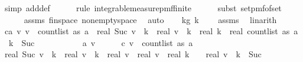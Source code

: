 \begin{isabellebody}
\ {\isacharparenleft}{\kern0pt}simp\ add{\isacharcolon}{\kern0pt}{\isasymOmega}{\isacharunderscore}{\kern0pt}def{\isacharparenright}{\kern0pt}\isanewline
\ \ \ \ \isamarkupfalse%
\ {\isacharparenleft}{\kern0pt}rule\ integrable{\isacharunderscore}{\kern0pt}measure{\isacharunderscore}{\kern0pt}pmf{\isacharunderscore}{\kern0pt}finite{\isacharparenright}{\kern0pt}\isanewline
\ \ \ \ \isamarkupfalse%
\ {\isacharparenleft}{\kern0pt}subst\ set{\isacharunderscore}{\kern0pt}pmf{\isacharunderscore}{\kern0pt}of{\isacharunderscore}{\kern0pt}set{\isacharparenright}{\kern0pt}\isanewline
\ \ \ \ \isamarkupfalse%
\ assms{\isacharparenleft}{\kern0pt}{}{\isacharparenright}{\kern0pt}\ fin{\isacharunderscore}{\kern0pt}space\ non{\isacharunderscore}{\kern0pt}empty{\isacharunderscore}{\kern0pt}space\ \isamarkupfalse%
\ auto\isanewline
\isanewline
\ \ \isamarkupfalse%
\ k{\isacharunderscore}{\kern0pt}g{\isacharunderscore}{\kern0pt}{}{\isacharcolon}{\kern0pt}\ {\isachardoublequoteopen}k\ {\isachargreater}{\kern0pt}\ {}{\isachardoublequoteclose}\ \isamarkupfalse%
\ assms\ \isamarkupfalse%
\ linarith\isanewline
\isanewline
\ \ \isamarkupfalse%
\ c{\isacharcolon}{\kern0pt}{\isachardoublequoteopen}{\isasymAnd}a\ v{\isachardot}{\kern0pt}\ v\ {\isacharless}{\kern0pt}\ count{\isacharunderscore}{\kern0pt}list\ as\ a\ {\isasymLongrightarrow}\ real\ {\isacharparenleft}{\kern0pt}Suc\ v\ {\isacharcircum}{\kern0pt}\ k{\isacharparenright}{\kern0pt}\ {\isacharminus}{\kern0pt}\ real\ {\isacharparenleft}{\kern0pt}v\ {\isacharcircum}{\kern0pt}\ k{\isacharparenright}{\kern0pt}\ {\isasymle}\ real\ k\ {\isacharasterisk}{\kern0pt}\ real\ {\isacharparenleft}{\kern0pt}count{\isacharunderscore}{\kern0pt}list\ as\ a{\isacharparenright}{\kern0pt}\ {\isacharcircum}{\kern0pt}\ {\isacharparenleft}{\kern0pt}k\ {\isacharminus}{\kern0pt}\ Suc\ {}{\isacharparenright}{\kern0pt}{\isachardoublequoteclose}\isanewline
\ \ \isamarkupfalse%
\ {\isacharminus}{\kern0pt}\isanewline
\ \ \ \ \isamarkupfalse%
\ a\ v\isanewline
\ \ \ \ \isamarkupfalse%
\ c{\isacharunderscore}{\kern0pt}{}{\isacharcolon}{\kern0pt}\ {\isachardoublequoteopen}v\ {\isacharless}{\kern0pt}\ count{\isacharunderscore}{\kern0pt}list\ as\ a{\isachardoublequoteclose}\isanewline
\ \ \ \ \isamarkupfalse%
\ {\isachardoublequoteopen}real\ {\isacharparenleft}{\kern0pt}Suc\ v\ {\isacharcircum}{\kern0pt}\ k{\isacharparenright}{\kern0pt}\ {\isacharminus}{\kern0pt}\ real\ {\isacharparenleft}{\kern0pt}v\ {\isacharcircum}{\kern0pt}\ k{\isacharparenright}{\kern0pt}\ {\isasymle}\ {\isacharparenleft}{\kern0pt}real\ {\isacharparenleft}{\kern0pt}v{\isacharplus}{\kern0pt}{}{\isacharparenright}{\kern0pt}\ {\isacharminus}{\kern0pt}\ real\ v{\isacharparenright}{\kern0pt}\ {\isacharasterisk}{\kern0pt}\ real\ k\ {\isacharasterisk}{\kern0pt}\ {\isacharparenleft}{\kern0pt}{}\ {\isacharplus}{\kern0pt}\ real\ v{\isacharparenright}{\kern0pt}\ {\isacharcircum}{\kern0pt}\ {\isacharparenleft}{\kern0pt}k\ {\isacharminus}{\kern0pt}\ Suc\ {}{\isacharparenright}{\kern0pt}{\isachardoublequoteclose}\isanewline

\end{isabellebody}
